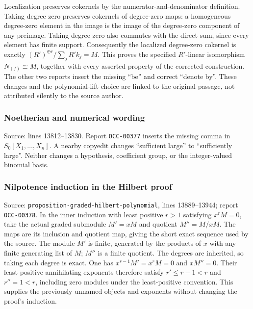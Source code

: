 Localization preserves cokernels by the numerator-and-denominator definition. Taking degree zero preserves cokernels of degree-zero maps: a homogeneous degree-zero element in the image is the image of the degree-zero component of any preimage. Taking degree zero also commutes with the direct sum, since every element has finite support. Consequently the localized degree-zero cokernel is exactly \((R')^{\oplus r}/\sum_j R'k_j=M\). This proves the specified \(R'\)-linear isomorphism \(N_{(f)}\cong M\), together with every asserted property of the corrected construction. The other two reports insert the missing ``be'' and correct ``denote by''. These changes and the polynomial-lift choice are linked to the original passage, not attributed silently to the source author.

\subsubsection{Noetherian and numerical wording}\label{noetherian-and-numerical-wording}

Source: lines 13812--13830. Report \texttt{OCC-00377} inserts the missing comma in \(S_0[X_1,\ldots,X_n]\). A nearby copyedit changes ``sufficient large'' to ``sufficiently large''. Neither changes a hypothesis, coefficient group, or the integer-valued binomial basis.

\subsubsection{Nilpotence induction in the Hilbert proof}\label{nilpotence-induction-in-the-hilbert-proof}

Source: \texttt{proposition-graded-hilbert-polynomial}, lines 13889--13944; report \texttt{OCC-00378}. In the inner induction with least positive \(r>1\) satisfying \(x^rM=0\), take the actual graded submodule \(M'=xM\) and quotient \(M''=M/xM\). The maps are its inclusion and quotient map, giving the short exact sequence used by the source. The module \(M'\) is finite, generated by the products of \(x\) with any finite generating list of \(M\); \(M''\) is a finite quotient. The degrees are inherited, so taking each degree is exact. One has \(x^{r-1}M'=x^rM=0\) and \(xM''=0\). Their least positive annihilating exponents therefore satisfy \(r'\leq r-1<r\) and \(r''=1<r\), including zero modules under the least-positive convention. This supplies the previously unnamed objects and exponents without changing the proof's induction.

